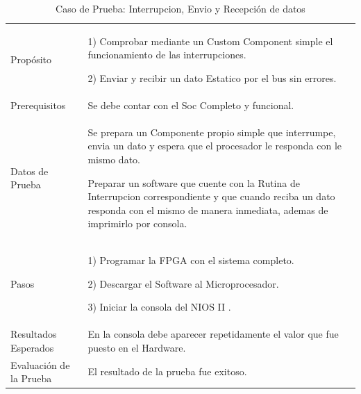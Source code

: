 \begin{table}
	\begin{tabular}{|>{\columncolor[gray]{0.8}}l|p{9cm}|} \hline
\multicolumn{2}{|>{\columncolor[gray]{0.8}}l|}{\textbf{Caso de Prueba: Interrupcion, Envio y Recepción de datos}}\\ \hline
Propósito  & 1) Comprobar mediante un Custom Component simple el funcionamiento de las interrupciones.

2) Enviar y recibir un dato Estatico por el bus sin errores. 
\\ \hline
 Prerequisitos  & Se debe contar con el Soc Completo y funcional.\\ \hline
 Datos de Prueba & Se prepara un Componente propio simple que interrumpe, envia un dato y espera que el procesador le responda con le mismo dato. 

Preparar un software que cuente con la Rutina de Interrupcion correspondiente y que cuando reciba un dato responda con el mismo de manera inmediata, ademas de imprimirlo por consola.
 \\ \hline
 Pasos & 1) Programar la FPGA con el sistema completo.

2) Descargar el Software al Microprocesador.

3) Iniciar la consola del NIOS II .
\\ \hline
 Resultados Esperados & En la consola debe aparecer repetidamente el valor que fue puesto en el Hardware. \\ \hline
 Evaluación de la Prueba  & El resultado de la prueba fue exitoso.\\ \hline
	\end{tabular}
	\caption{Caso de Prueba: Interrupcion, Envio y Recepción de datos}
	\label{tab:testsoc}
\end{table}

